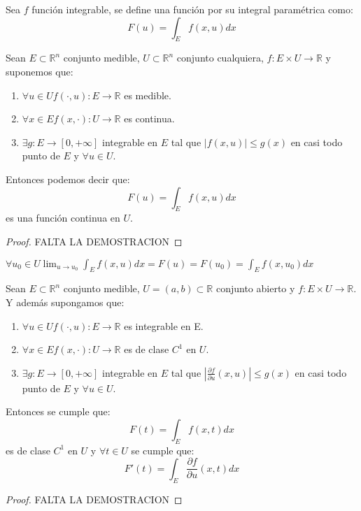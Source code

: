 \begin{definición}
    Sea $f$ función integrable, se define una función por su integral paramétrica como: 
    $$ F(u) = \int_{E}f(x, u)dx$$
\end{definición}
\begin{teorema}
    Sean $E \subset \mathbb{R}^n$ conjunto medible, $U \subset \mathbb{R}^n$ conjunto cualquiera, $f: E \times U \to \mathbb{R}$ y suponemos que: 
    \begin{enumerate}
        \item $\forall u \in U f(\cdot, u): E \to \mathbb{R}$ es medible.
        \item $\forall x \in E f(x, \cdot): U \to \mathbb{R}$ es continua.
        \item $\exists g: E \to [0, +\infty]$ integrable en $E$ tal que $|f(x, u)| \leq g(x)$ en casi todo punto de $E$ y $\forall u \in U$.
    \end{enumerate}
    Entonces podemos decir que: 
    $$ F(u) = \int_{E}f(x, u)dx $$ es una función continua en $U$.
\end{teorema}
\begin{proof}
    FALTA LA DEMOSTRACION
\end{proof}
\begin{observación}
    $\forall u_0 \in U \lim_{u \to u_0} \int_{E}f(x, u)dx = F(u) = F(u_0) = \int_{E}f(x, u_0)dx$
\end{observación}
\begin{teorema}
    Sean $E \subset \mathbb{R}^n$ conjunto medible, $U = (a, b) \subset \mathbb{R}$ conjunto abierto y $f: E \times U \to \mathbb{R}$. Y además supongamos que: 
    \begin{enumerate}
        \item $\forall u \in U f(\cdot, u): E \to \mathbb{R}$ es integrable en E.
        \item $\forall x \in E f(x, \cdot): U \to \mathbb{R}$ es de clase $C^1$ en $U$.
        \item $\exists g: E \to [0, +\infty]$ integrable en $E$ tal que $|\frac{\partial f}{\partial u}(x, u)| \leq g(x)$ en casi todo punto de $E$ y $\forall u \in U$.
    \end{enumerate}
    Entonces se cumple que: 
    $$ F(t) = \int_{E}f(x,t)dx $$ es de clase $C^1$ en $U$ y $\forall t \in U$ se cumple que: $$ F'(t) = \int_{E}\frac{\partial f}{\partial u}(x, t)dx $$
\end{teorema}
\begin{proof}
    FALTA LA DEMOSTRACION
\end{proof}